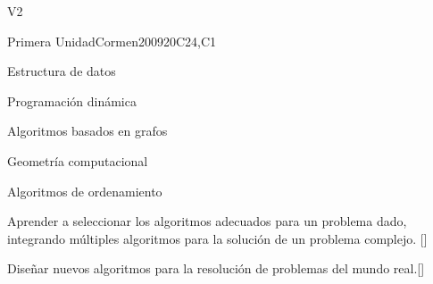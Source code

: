 \begin{syllabus}
\begin{competences}{V2}
    \item {}
    \item {}
    \item {}
\end{competences}

\begin{unit}{Primera Unidad}{}{Cormen2009}{20}{C24,C1}
\begin{topics}
        \item Estructura de datos
        \item Programación dinámica
        \item Algoritmos basados en grafos
        \item Geometría computacional
        \item Algoritmos de ordenamiento
\end{topics}
\begin{learningoutcomes}
        \item Aprender a seleccionar los algoritmos adecuados para un problema dado, integrando múltiples algoritmos para la solución de un problema complejo. [\Usage]
	\item Diseñar nuevos algoritmos para la resolución de problemas del mundo real.[\Usage]
\end{learningoutcomes}
\end{unit}

\begin{coursebibliography}
\end{coursebibliography}

\end{syllabus}
